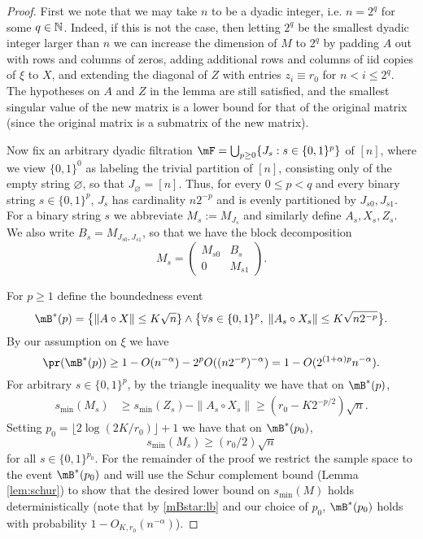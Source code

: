 \documentclass[aop,preprint]{imsart}
\theoremstyle{plain}
\theoremstyle{definition}
\theoremstyle{remark}
\numberwithin{equation}{section}
\numberwithin{theorem}{section}
\def \lf {\lfloor}
\def \rf {\rfloor}
\begin{document}
\begin{proof}
First we note that we may take $n$ to be a dyadic integer, i.e. $n=2^q$ for some $q\in {\mathbb N}$.
Indeed, if this is not the case, then letting $2^q$ be the smallest dyadic integer larger than $n$ we can increase the dimension of $M$ to $2^q$ by padding $A$ out with rows and columns of zeros, adding additional rows and columns of iid copies of $\xi$ to $X$, and extending the diagonal of $Z$ with entries $z_i\equiv r_0$ for $n<i\le 2^q$.
The hypotheses on $A$ and $Z$ in the lemma are still satisfied, and the smallest singular value of the new matrix is a lower bound for that of the original matrix (since the original matrix is a submatrix of the new matrix).

Now fix an arbitrary dyadic filtration $\mF= \bigcup_{p\ge 0}\{J_s: s\in \{0,1\}^p\}$ of $[n]$, where we view $\{0,1\}^0$ as labeling the trivial partition of $[n]$, consisting only of the empty string $\varnothing$, so that $J_\varnothing = [n]$. 
Thus, for every $0\le p< q$ and every binary string $s\in \{0,1\}^{p}$, $J_s$ has cardinality $n2^{-p}$ and is evenly partitioned by $J_{s0},J_{s1}$. 
For a binary string $s$ we abbreviate $M_s:= M_{J_s}$ and similarly define $A_s,X_s,Z_s$. 
We also write $B_s=M_{J_{s0},J_{s1}}$, so that we have the block decomposition
\begin{equation}	\label{Ms:block}
M_s= \begin{pmatrix} M_{s0} & B_s\\ 0 & M_{s1} \end{pmatrix}.
\end{equation}

For $p\ge1$ define the boundedness event 
\begin{equation}
\mB^*(p) = \big\{ \|A\circ X\| \le K\sqrt{n}\} \wedge \big\{ \forall s\in \{0,1\}^{p}, \; \|A_s\circ X_s\| \le K\sqrt{n 2^{-p}}\big\}.
\end{equation}
By our assumption on $\xi$ we have 
\begin{equation}	\label{mBstar:lb}
\pr(\mB^*(p))\ge 1- O(n^{-\alpha}) - 2^{p} O((n2^{-p})^{-\alpha}) = 1- O(2^{(1+\alpha)p}n^{-\alpha}).
\end{equation}
For arbitrary $s\in \{0,1\}^{p}$, by the triangle inequality we have that on $\mB^*(p)$,
\begin{align*}
s_{\min}(M_s) &\ge s_{\min}(Z_s) - \|A_s\circ X_s\| \ge (r_0 - K2^{-p/2})\sqrt{n}.
\end{align*}
Setting $p_0= \lf 2\log (2K/r_0)\rf +1$ we have that on $\mB^*(p_0)$,
\begin{equation}	\label{lambdap:00}
s_{\min}(M_s) \ge (r_0/2)\sqrt{n}
\end{equation}
for all $s\in \{0,1\}^{p_0}$.
For the remainder of the proof we restrict the sample space to the event $\mB^*(p_0)$ and will use the Schur complement bound (Lemma \ref{lem:schur}) to show that the desired lower bound on $s_{\min}(M)$ holds deterministically (note that by \eqref{mBstar:lb} and our choice of $p_0$, $\mB^*(p_0)$ holds with probability 
$1-O_{K,r_0}(n^{-\alpha})$).
%


\end{proof}
\end{document}
